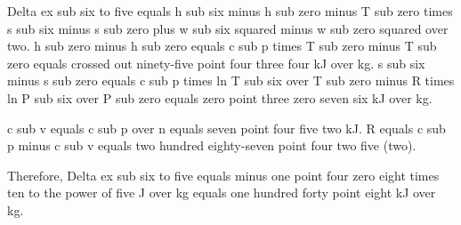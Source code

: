 Delta ex sub six to five equals h sub six minus h sub zero minus T sub zero times s sub six minus s sub zero plus w sub six squared minus w sub zero squared over two.  
h sub zero minus h sub zero equals c sub p times T sub zero minus T sub zero equals crossed out ninety-five point four three four kJ over kg.  
s sub six minus s sub zero equals c sub p times ln T sub six over T sub zero minus R times ln P sub six over P sub zero equals zero point three zero seven six kJ over kg.  

c sub v equals c sub p over n equals seven point four five two kJ.  
R equals c sub p minus c sub v equals two hundred eighty-seven point four two five (two).  

Therefore, Delta ex sub six to five equals minus one point four zero eight times ten to the power of five J over kg equals one hundred forty point eight kJ over kg.
